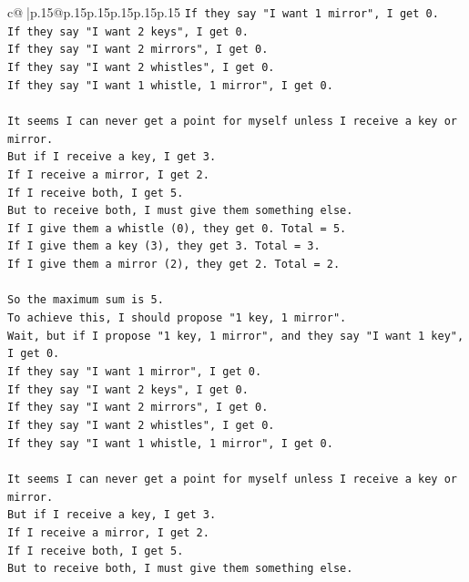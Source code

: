 \documentclass{article}
\begin{document}
{\begin{supertabular}{c@{$\;$}|p{.15\linewidth}@{}p{.15\linewidth}p{.15\linewidth}p{.15\linewidth}p{.15\linewidth}p{.15\linewidth}}
{{{\texttt{If they say "I want 1 mirror", I get 0.} \\
\texttt{If they say "I want 2 keys", I get 0.} \\
\texttt{If they say "I want 2 mirrors", I get 0.} \\
\texttt{If they say "I want 2 whistles", I get 0.} \\
\texttt{If they say "I want 1 whistle, 1 mirror", I get 0.} \\
\\ 
\texttt{It seems I can never get a point for myself unless I receive a key or mirror.} \\
\texttt{But if I receive a key, I get 3.} \\
\texttt{If I receive a mirror, I get 2.} \\
\texttt{If I receive both, I get 5.} \\
\texttt{But to receive both, I must give them something else.} \\
\texttt{If I give them a whistle (0), they get 0. Total = 5.} \\
\texttt{If I give them a key (3), they get 3. Total = 3.} \\
\texttt{If I give them a mirror (2), they get 2. Total = 2.} \\
\\ 
\texttt{So the maximum sum is 5.} \\
\texttt{To achieve this, I should propose "1 key, 1 mirror".} \\
\texttt{Wait, but if I propose "1 key, 1 mirror", and they say "I want 1 key", I get 0.} \\
\texttt{If they say "I want 1 mirror", I get 0.} \\
\texttt{If they say "I want 2 keys", I get 0.} \\
\texttt{If they say "I want 2 mirrors", I get 0.} \\
\texttt{If they say "I want 2 whistles", I get 0.} \\
\texttt{If they say "I want 1 whistle, 1 mirror", I get 0.} \\
\\ 
\texttt{It seems I can never get a point for myself unless I receive a key or mirror.} \\
\texttt{But if I receive a key, I get 3.} \\
\texttt{If I receive a mirror, I get 2.} \\
\texttt{If I receive both, I get 5.} \\
\texttt{But to receive both, I must give them something else.} \\
}}}
\end{supertabular}}
\end{document}
